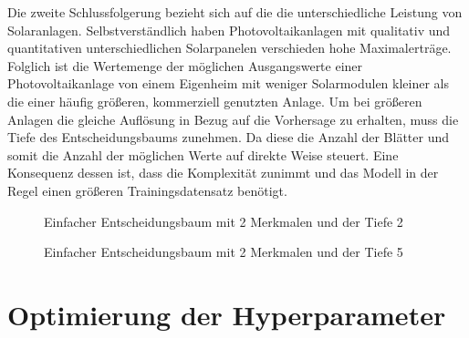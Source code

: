 \documentclass[12pt, a4paper]{article}
\begin{document}
Die zweite Schlussfolgerung bezieht sich auf die die unterschiedliche Leistung von Solaranlagen. Selbstverständlich haben Photovoltaikanlagen mit qualitativ und quantitativen unterschiedlichen Solarpanelen verschieden hohe Maximalerträge. Folglich ist die Wertemenge der möglichen Ausgangswerte einer Photovoltaikanlage von einem Eigenheim mit weniger Solarmodulen kleiner als die einer häufig größeren, kommerziell genutzten Anlage. Um bei größeren Anlagen die gleiche Auflösung in Bezug auf die Vorhersage zu erhalten, muss die Tiefe des Entscheidungsbaums zunehmen. Da diese die Anzahl der Blätter und somit die Anzahl der möglichen Werte auf direkte Weise steuert. Eine Konsequenz dessen ist, dass die Komplexität zunimmt und das Modell in der Regel einen größeren Trainingsdatensatz benötigt.


\begin{figure}
\centering
\def\svgwidth{350pt}

\caption{Einfacher Entscheidungsbaum mit 2 Merkmalen und der Tiefe 2}
\label{fig:decisiontree_example_2}
\end {figure}




\begin{figure}
\centering
\def\svgwidth{350pt}

\caption{Einfacher Entscheidungsbaum mit 2 Merkmalen und der Tiefe 5}
\label{fig:decisiontree_example}
\end {figure}



\newpage

\section{Optimierung der Hyperparameter}
\end{document}
